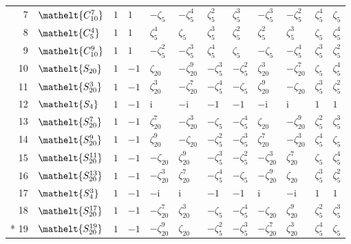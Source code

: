 \documentclass[10pt,a4paper]{article}
\numberwithin{equation}{section}
\newcommand{\eltfont}[1]{{\let\sigma\eltsigma\mathelt{#1}}}
\newcommand{\cls}[1]{\eltfont{#1}}
\newcommand{\iunit}{\mathrm{i}}
\newcommand{\rootunity}[1]{\zeta_{#1}}
\begin{document}
{\begin{longtable}{@{}rlllllllllll@{}}
7 & $\cls{C_{10}^{7}}$ & $1$ & $1$ & $-\rootunity{5}$ & $-\rootunity{5}^{4}$ & $\rootunity{5}^{2}$ & $\rootunity{5}^{3}$ & $-\rootunity{5}^{3}$ & $-\rootunity{5}^{2}$ & $\rootunity{5}^{4}$ & $\rootunity{5}$\\
8 & $\cls{C_{5}^{4}}$ & $1$ & $1$ & $\rootunity{5}^{4}$ & $\rootunity{5}$ & $\rootunity{5}^{3}$ & $\rootunity{5}^{2}$ & $\rootunity{5}^{2}$ & $\rootunity{5}^{3}$ & $\rootunity{5}$ & $\rootunity{5}^{4}$\\
9 & $\cls{C_{10}^{9}}$ & $1$ & $1$ & $-\rootunity{5}^{2}$ & $-\rootunity{5}^{3}$ & $\rootunity{5}^{4}$ & $\rootunity{5}$ & $-\rootunity{5}$ & $-\rootunity{5}^{4}$ & $\rootunity{5}^{3}$ & $\rootunity{5}^{2}$\\
10 & $\cls{S_{20}}$ & $1$ & $-1$ & $\rootunity{20}$ & $-\rootunity{20}^{9}$ & $-\rootunity{5}^{3}$ & $-\rootunity{5}^{2}$ & $\rootunity{20}^{3}$ & $-\rootunity{20}^{7}$ & $\rootunity{5}$ & $\rootunity{5}^{4}$\\
11 & $\cls{S_{20}^{3}}$ & $1$ & $-1$ & $\rootunity{20}^{3}$ & $-\rootunity{20}^{7}$ & $-\rootunity{5}^{4}$ & $-\rootunity{5}$ & $\rootunity{20}^{9}$ & $-\rootunity{20}$ & $\rootunity{5}^{3}$ & $\rootunity{5}^{2}$\\
12 & $\cls{S_{4}}$ & $1$ & $-1$ & $\iunit{}$ & $-\iunit{}$ & $-1$ & $-1$ & $-\iunit{}$ & $\iunit{}$ & $1$ & $1$\\
13 & $\cls{S_{20}^{7}}$ & $1$ & $-1$ & $\rootunity{20}^{7}$ & $-\rootunity{20}^{3}$ & $-\rootunity{5}$ & $-\rootunity{5}^{4}$ & $\rootunity{20}$ & $-\rootunity{20}^{9}$ & $\rootunity{5}^{2}$ & $\rootunity{5}^{3}$\\
14 & $\cls{S_{20}^{9}}$ & $1$ & $-1$ & $\rootunity{20}^{9}$ & $-\rootunity{20}$ & $-\rootunity{5}^{2}$ & $-\rootunity{5}^{3}$ & $\rootunity{20}^{7}$ & $-\rootunity{20}^{3}$ & $\rootunity{5}^{4}$ & $\rootunity{5}$\\
15 & $\cls{S_{20}^{11}}$ & $1$ & $-1$ & $-\rootunity{20}$ & $\rootunity{20}^{9}$ & $-\rootunity{5}^{3}$ & $-\rootunity{5}^{2}$ & $-\rootunity{20}^{3}$ & $\rootunity{20}^{7}$ & $\rootunity{5}$ & $\rootunity{5}^{4}$\\
16 & $\cls{S_{20}^{13}}$ & $1$ & $-1$ & $-\rootunity{20}^{3}$ & $\rootunity{20}^{7}$ & $-\rootunity{5}^{4}$ & $-\rootunity{5}$ & $-\rootunity{20}^{9}$ & $\rootunity{20}$ & $\rootunity{5}^{3}$ & $\rootunity{5}^{2}$\\
17 & $\cls{S_{4}^{3}}$ & $1$ & $-1$ & $-\iunit{}$ & $\iunit{}$ & $-1$ & $-1$ & $\iunit{}$ & $-\iunit{}$ & $1$ & $1$\\
18 & $\cls{S_{20}^{17}}$ & $1$ & $-1$ & $-\rootunity{20}^{7}$ & $\rootunity{20}^{3}$ & $-\rootunity{5}$ & $-\rootunity{5}^{4}$ & $-\rootunity{20}$ & $\rootunity{20}^{9}$ & $\rootunity{5}^{2}$ & $\rootunity{5}^{3}$\\*
19 & $\cls{S_{20}^{19}}$ & $1$ & $-1$ & $-\rootunity{20}^{9}$ & $\rootunity{20}$ & $-\rootunity{5}^{2}$ & $-\rootunity{5}^{3}$ & $-\rootunity{20}^{7}$ & $\rootunity{20}^{3}$ & $\rootunity{5}^{4}$ & $\rootunity{5}$\\
\bottomrule\end{longtable}}
\end{document}
